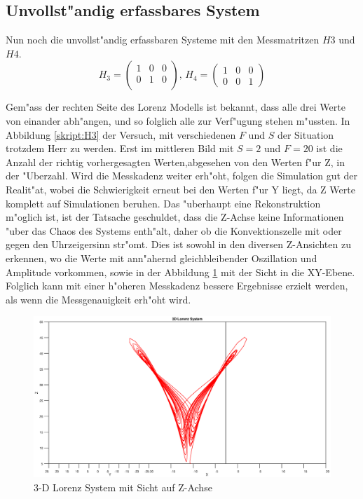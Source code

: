 \begin{refsection}
\subsection{Unvollst"andig erfassbares System}
Nun noch die unvollst"andig erfassbaren Systeme mit den Messmatritzen $H3$ und $H4$.
\[H_{3}=\begin{pmatrix}
1 & 0 & 0 \\ 
0 & 1 & 0 \\ 
\end{pmatrix} 
\text{, }
H_{4}=\begin{pmatrix}
1 & 0 & 0 \\ 
0 & 0 & 1
\end{pmatrix}\]

Gem"ass der rechten Seite des Lorenz Modells ist bekannt, dass alle drei Werte von einander abh"angen, und so folglich alle zur Verf"ugung stehen m"ussten. In Abbildung \ref{skript:H3} der Versuch, mit verschiedenen $F$ und $S$ der Situation trotzdem Herr zu werden. Erst im mittleren Bild mit $S=2$ und $F=20$ ist die Anzahl der richtig vorhergesagten Werten,abgesehen von den Werten f"ur Z, in der "Uberzahl. Wird die Messkadenz weiter erh"oht, folgen die Simulation gut der Realit"at, wobei die Schwierigkeit erneut bei den Werten f"ur Y liegt, da Z Werte komplett auf Simulationen beruhen. Das "uberhaupt eine Rekonstruktion m"oglich ist, ist der Tatsache geschuldet, dass die Z-Achse keine Informationen "uber das Chaos des Systems enth"alt, daher ob die Konvektionszelle mit oder gegen den Uhrzeigersinn str"omt. Dies ist sowohl in den diversen Z-Ansichten zu erkennen, wo die Werte mit ann"ahernd gleichbleibender Oszillation und Amplitude vorkommen, sowie in der Abbildung \ref{skript:zview} mit der Sicht in die XY-Ebene.
Folglich kann mit einer h"oheren Messkadenz bessere Ergebnisse erzielt werden, als wenn die Messgenauigkeit erh"oht wird.

\begin{figure}
\centering
\includegraphics[width=\hsize]{kalman/figures/zview.eps}
\caption{3-D Lorenz System mit Sicht auf Z-Achse}
\label{skript:zview}
\end{figure}


\end{refsection}

